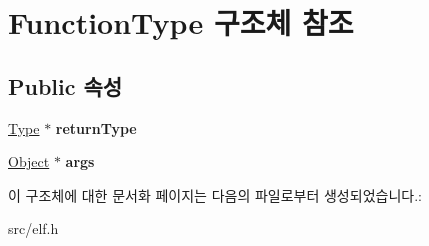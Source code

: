\hypertarget{struct_function_type}{}\section{Function\+Type 구조체 참조}
\label{struct_function_type}
\subsection*{Public 속성}
\begin{DoxyCompactItemize}
\item 
\mbox{\label{struct_function_type_a4512eaeaafe53ef9056acd3314263aaa}} 
\mbox{\hyperlink{struct_type}{Type}} $\ast$ {\bfseries return\+Type}
\item 
\mbox{\label{struct_function_type_ab4656e6133839aaa9b96e48949397a6a}} 
\mbox{\hyperlink{struct_object}{Object}} $\ast$ {\bfseries args}
\end{DoxyCompactItemize}


이 구조체에 대한 문서화 페이지는 다음의 파일로부터 생성되었습니다.\+:\begin{DoxyCompactItemize}
\item 
src/elf.\+h\end{DoxyCompactItemize}
